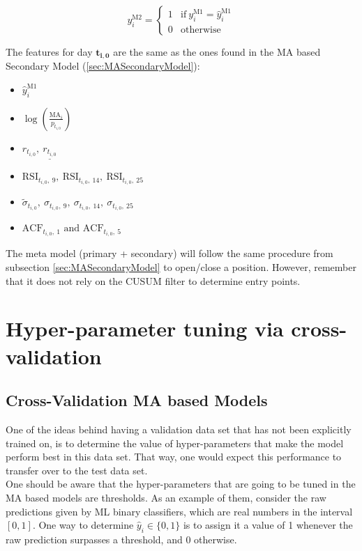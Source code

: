 \documentclass[a4paper]{report}
\begin{document}
\begin{equation*}
	y^{\text{M2}}_i =
	\begin{cases}
	1 & \text{if}\ y^{\text{M1}}_i = \widehat{y}^{\text{M1}}_i\\
	0 & \text{otherwise}
	\end{cases}
\end{equation*}

The features for day $\boldsymbol{t_{i,0}}$ are the same as the ones 
found in the MA based Secondary Model (\ref{sec:MASecondaryModel}):

\begin{itemize}
	\item $\widehat{y}_i^{\text{M1}}$	
	\item $\log \left( \frac{\text{MA}_{i}}{p_{t_{i,0}}} \right)$	
	\item $r_{t_{i,0}},\ \underline{r_{t_{i,0}}}$
	\item $\text{RSI}_{t_{i,0},\ 9},\
	\text{RSI}_{t_{i,0},\ 14},\
	\text{RSI}_{t_{i,0},\ 25}$
	\item $\tilde{\sigma}_{t_{i,0}},\
	\sigma_{t_{i,0},\ 9},\ \sigma_{t_{i,0},\ 14},\ 
	\sigma_{t_{i,0},\ 25}$
	\item $\text{ACF}_{t_{i,0},\ 1} \text{ and } \text{ACF}_{t_{i,0},\ 5}$
\end{itemize}

\vspace{.5cm}

The meta model (primary + secondary) will follow the same procedure from 
subsection \ref{sec:MASecondaryModel} to open/close a position. However, 
remember that it does not rely on the CUSUM filter to determine entry 
points.

\section{Hyper-parameter tuning via cross-validation}
\subsection{Cross-Validation MA based Models}
One of the ideas behind having a validation data set that has not been 
explicitly trained on, is to determine the value of hyper-parameters that 
make the model perform best in this data set. That way, one would expect this 
performance to transfer over to the test data set.\\

One should be aware that the hyper-parameters that are going to be tuned in 
the MA based models are thresholds. As an example of them, consider the raw 
predictions given by ML binary classifiers, which are real numbers in the 
interval $[0,1]$. One way to determine $\widehat{y}_i \in \{0,1\}$ is to 
assign it a value of 1 whenever the raw prediction surpasses a threshold, and 
0 otherwise.\\
\end{document}
